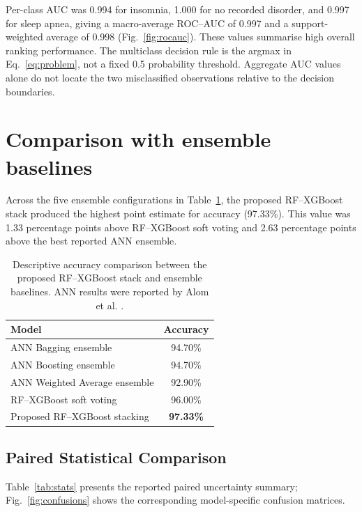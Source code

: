 \documentclass[a4paper,fleqn]{cas-dc}
\begin{document}
Per-class AUC was 0.994 for insomnia, 1.000 for no recorded disorder, and 0.997 for sleep apnea, giving a macro-average ROC--AUC of 0.997 and a support-weighted average of 0.998 (Fig.~\ref{fig:rocauc}). These values summarise high overall ranking performance. The multiclass decision rule is the argmax in Eq.~\eqref{eq:problem}, not a fixed 0.5 probability threshold. Aggregate AUC values alone do not locate the two misclassified observations relative to the decision boundaries.


\section{Comparison with ensemble baselines}
\label{sec:comparison}
Across the five ensemble configurations in Table~\ref{tab:basecomparison}, the proposed RF--XGBoost stack produced the highest point estimate for accuracy (97.33\%). This value was 1.33 percentage points above RF--XGBoost soft voting and 2.63 percentage points above the best reported ANN ensemble.

\begin{table}[width=\textwidth,pos=!tbp]
\centering
\caption{Descriptive accuracy comparison between the proposed RF--XGBoost stack and ensemble baselines. ANN results were reported by Alom et al. \cite{alom2024}.}
\label{tab:basecomparison}
\small
\begin{tabularx}{0.74\linewidth}{@{}X c@{}}
\toprule
Model & Accuracy \\
\midrule
ANN Bagging ensemble & 94.70\% \\
ANN Boosting ensemble & 94.70\% \\
ANN Weighted Average ensemble & 92.90\% \\
RF--XGBoost soft voting & 96.00\% \\
Proposed RF--XGBoost stacking & \textbf{97.33\%} \\
\bottomrule
\end{tabularx}
\end{table}


\subsection{Paired Statistical Comparison}
\label{sec:paired}
Table~\ref{tab:stats} presents the reported paired uncertainty summary; Fig.~\ref{fig:confusions} shows the corresponding model-specific confusion matrices.
\end{document}
